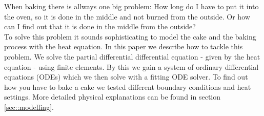 
When baking there is allways one big problem: How long do I have to put it into the oven, so it is done in the middle and not burned from the outside. Or how can I find out that it is done in the middle from the outside? \\

To solve this problem it sounds sophisticating to model the cake and the baking process with the heat equation. In this paper we describe how to tackle this problem. We solve the partial differential differential equation - given by the heat equation - using finite elements. By this we gain a system of ordinary differential equations (ODEs) which we then solve with a fitting ODE solver. To find out how you have to bake a cake we tested different boundary conditions and heat settings. More detailed physical explanations can be found in section \ref{sec::modelling}.